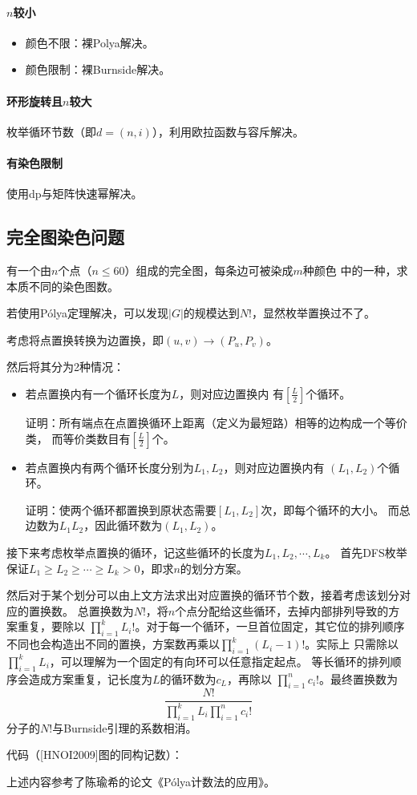 \paragraph{$n$较小}
\begin{itemize}
	\item 颜色不限：裸Polya解决。
	\item 颜色限制：裸Burnside解决。
\end{itemize}
\paragraph{环形旋转且$n$较大}
枚举循环节数（即$d=(n,i)$），利用欧拉函数与容斥解决。
\paragraph{有染色限制}
使用dp与矩阵快速幂解决。

\subsection{完全图染色问题}
有一个由$n$个点（$n\leq 60$）组成的完全图，每条边可被染成$m$种颜色
中的一种，求本质不同的染色图数。

若使用Pólya定理解决，可以发现$|G|$的规模达到$N!$，显然枚举置换过不了。

考虑将点置换转换为边置换，即$(u,v)\rightarrow (P_u,P_v)$。

然后将其分为2种情况：
\begin{itemize}
	\item 若点置换内有一个循环长度为$L$，则对应边置换内
	有$\left[\frac{L}{2}\right]$个循环。

	证明：所有端点在点置换循环上距离（定义为最短路）相等的边构成一个等价类，
	而等价类数目有$\left[\frac{L}{2}\right]$个。

	\item 若点置换内有两个循环长度分别为$L_1,L_2$，则对应边置换内有
	$(L_1,L_2)$个循环。

	证明：使两个循环都置换到原状态需要$[L_1,L_2]$次，即每个循环的大小。
	而总边数为$L_1L_2$，因此循环数为$(L_1,L_2)$。
\end{itemize}

接下来考虑枚举点置换的循环，记这些循环的长度为$L_1,L_2,\cdots,L_k$。
首先DFS枚举保证$L_1\geq L_2 \geq \cdots \geq L_k>0$，即求$n$的划分方案。

然后对于某个划分可以由上文方法求出对应置换的循环节个数，接着考虑该划分对应的置换数。
总置换数为$N!$，将$n$个点分配给这些循环，去掉内部排列导致的方案重复，要除以
$\displaystyle \prod_{i=1}^k{L_i!}$。对于每一个循环，一旦首位固定，其它位的排列顺序
不同也会构造出不同的置换，方案数再乘以$\displaystyle \prod_{i=1}^k{(L_i-1)!}$。实际上
只需除以$\displaystyle \prod_{i=1}^k{L_i}$，可以理解为一个固定的有向环可以任意指定起点。
等长循环的排列顺序会造成方案重复，记长度为$L$的循环数为$c_L$，再除以
$\displaystyle \prod_{i=1}^n{c_i!}$。最终置换数为
\begin{displaymath}
	\frac{N!}{\prod_{i=1}^k{L_i}\prod_{i=1}^n{c_i!}}
\end{displaymath}
分子的$N!$与Burnside引理的系数相消。

代码（[HNOI2009]图的同构记数）：


上述内容参考了陈瑜希的论文《Pólya计数法的应用》。
